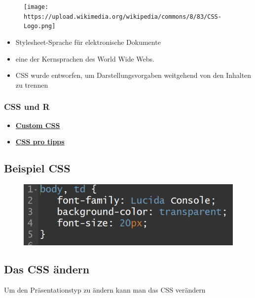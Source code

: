 \documentclass[]{article}
\providecommand{\tightlist}{%
  \setlength{\itemsep}{0pt}\setlength{\parskip}{0pt}}
\begin{document}
\begin{figure}
\centering
\texttt{[image: https://upload.wikimedia.org/wikipedia/commons/8/83/CSS-Logo.png]}
\caption{}
\end{figure}

\begin{itemize}
\tightlist
\item
  Stylesheet-Sprache für elektronische Dokumente
\item
  eine der Kernsprachen des World Wide Webs.
\item
  CSS wurde entworfen, um Darstellungsvorgaben weitgehend von den
  Inhalten zu trennen
\end{itemize}

\subsubsection{CSS und R}\label{css-und-r}

\begin{itemize}
\tightlist
\item
  \href{http://rmarkdown.rstudio.com/html_document_format.html\#custom_css}{\textbf{Custom
  CSS}}
\item
  \href{https://github.com/AllThingsSmitty/css-protips\#use-a-css-reset}{\textbf{CSS
  pro tipps}}
\end{itemize}

\subsection{Beispiel CSS}\label{beispiel-css}

\begin{figure}
\centering
\includegraphics{figure/cssRstudio.PNG}
\caption{}
\end{figure}

\subsection{Das CSS ändern}\label{das-css-andern}

Um den Präsentationstyp zu ändern kann man das CSS verändern
\end{document}
